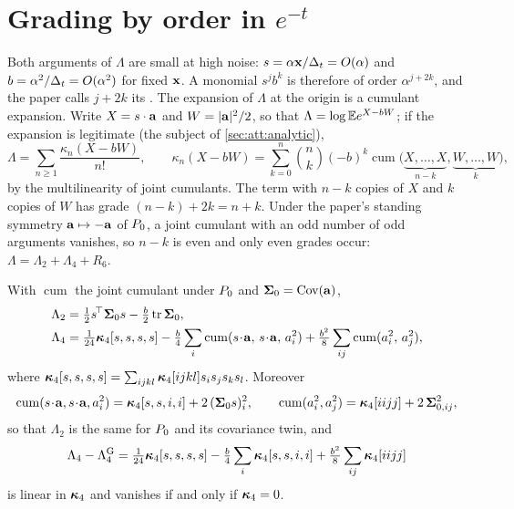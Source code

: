 \section{Grading by order in $e^{-t}$}
\label{sec:att:grading}

Both arguments of $\Lambda$ are small at high noise: $s=\alpha\mathbf{x}/\Delta_t=O(\alpha)$ and
$b=\alpha^2/\Delta_t=O(\alpha^2)$ for fixed $\mathbf{x}$. A monomial $s^jb^k$ is therefore of order
$\alpha^{j+2k}$, and the paper calls $j+2k$ its . The expansion of
$\Lambda$ at the origin is a cumulant expansion. Write $X=s\cdot\mathbf{a}$ and $W=|\mathbf{a}|^2/2$,
so that $\Lambda=\log\mathbb{E} e^{X-bW}$; if the expansion is legitimate (the subject of
\cref{sec:att:analytic}),
\begin{equation}
  \Lambda=\sum_{n\ge1}\frac{\kappa_n(X-bW)}{n!},\qquad
  \kappa_n(X-bW)=\sum_{k=0}^{n}\binom nk(-b)^k\operatorname{cum}\bigl(\underbrace{X,\dots,X}_{n-k},\underbrace{W,\dots,W}_{k}\bigr),
  \label{eq:att:cumexp}
\end{equation}
by the multilinearity of joint cumulants. The term with $n-k$ copies of $X$ and $k$
copies of $W$ has grade $(n-k)+2k=n+k$. Under the paper's standing symmetry
$\mathbf{a}\mapsto-\mathbf{a}$ of $P_0$, a joint cumulant with an odd number of odd arguments
vanishes, so $n-k$ is even and only even grades occur: $\Lambda=\Lambda_2+\Lambda_4+R_6$.

\begin{proposition}
\label{prop:att:grades}
With $\operatorname{cum}$ the joint cumulant under $P_0$ and $\mathbf{\Sigma}_0=\operatorname{Cov}(\mathbf{a})$,
\begin{align}
  \Lambda_2&=\tfrac12s^{\!\top}\mathbf{\Sigma}_0s-\tfrac b2\operatorname{tr}\mathbf{\Sigma}_0,
  \label{eq:att:lambda2}\\
  \Lambda_4&=\tfrac1{24}\bm{\kappa}_4[s,s,s,s]
   -\tfrac b4\sum_i\operatorname{cum}(s\!\cdot\!\mathbf{a},\,s\!\cdot\!\mathbf{a},\,a_i^2)
   +\tfrac{b^2}8\sum_{ij}\operatorname{cum}(a_i^2,\,a_j^2),
  \label{eq:att:lambda4}
\end{align}
where $\bm{\kappa}_4[s,s,s,s]=\sum_{ijkl}\bm{\kappa}_4[ijkl]s_is_js_ks_l$. Moreover
\begin{equation}
  \operatorname{cum}(s\!\cdot\!\mathbf{a},s\!\cdot\!\mathbf{a},a_i^2)=\bm{\kappa}_4[s,s,i,i]+2\,(\mathbf{\Sigma}_0s)_i^2,\qquad
  \operatorname{cum}(a_i^2,a_j^2)=\bm{\kappa}_4[iijj]+2\,\mathbf{\Sigma}_{0,ij}^2,
  \label{eq:att:cumsq}
\end{equation}
so that $\Lambda_2$ is the same for $P_0$ and its covariance twin, and
\begin{equation}
  \Lambda_4-\Lambda_4^{\mathrm G}=\tfrac1{24}\bm{\kappa}_4[s,s,s,s]-\tfrac b4\sum_i\bm{\kappa}_4[s,s,i,i]+\tfrac{b^2}8\sum_{ij}\bm{\kappa}_4[iijj]
  \label{eq:att:lambda4diff}
\end{equation}
is linear in $\bm{\kappa}_4$ and vanishes if and only if $\bm{\kappa}_4=0$.
\end{proposition}

